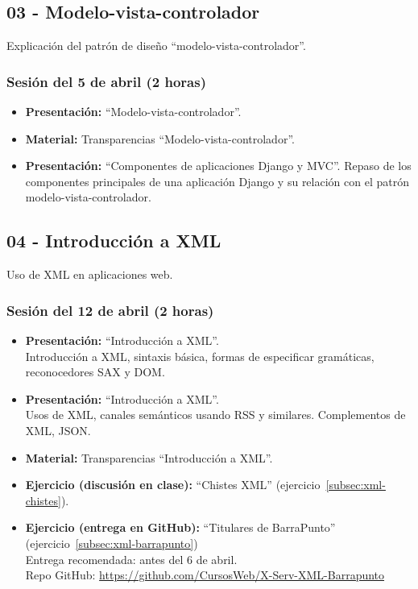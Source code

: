 \documentclass[a4paper,12pt]{article}
\begin{document}
\subsection{03 - Modelo-vista-controlador}

Explicación del patrón de diseño ``modelo-vista-controlador''.

\subsubsection{Sesión del 5 de abril (2 horas)}

\begin{itemize}
\item \textbf{Presentación:} ``Modelo-vista-controlador''.
\item \textbf{Material:} Transparencias ``Modelo-vista-controlador''.
\item \textbf{Presentación:} ``Componentes de aplicaciones Django y MVC''.
 Repaso de los componentes principales de una aplicación Django y su relación con el patrón modelo-vista-controlador.
\end{itemize}

\subsection{04 - Introducción a XML}

Uso de XML en aplicaciones web.

\subsubsection{Sesión del 12 de abril (2 horas)}

\begin{itemize}
\item \textbf{Presentación:} ``Introducción a XML''. \\
 Introducción a XML, sintaxis básica, formas de especificar gramáticas, reconocedores SAX y DOM.
\item \textbf{Presentación:} ``Introducción a XML''. \\
Usos de XML, canales semánticos usando RSS y similares. Complementos de XML, JSON.
\item \textbf{Material:} Transparencias ``Introducción a XML''.
\item \textbf{Ejercicio (discusión en clase):} ``Chistes XML'' (ejercicio~\ref{subsec:xml-chistes}).
\item \textbf{Ejercicio (entrega en GitHub):} ``Titulares de BarraPunto'' (ejercicio~\ref{subsec:xml-barrapunto}) \\
  Entrega recomendada: antes del 6 de abril. \\
  Repo GitHub: \url{https://github.com/CursosWeb/X-Serv-XML-Barrapunto}
\end{itemize}
\end{document}
